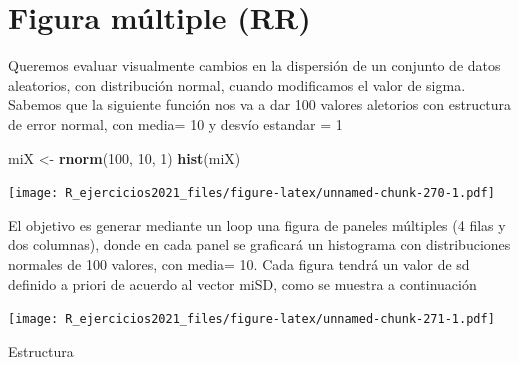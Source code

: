 \documentclass[]{book}
\newenvironment{Shaded}{\begin{snugshade}}{\end{snugshade}}
\newcommand{\DecValTok}[1]{\textcolor[rgb]{0.00,0.00,0.81}{#1}}
\newcommand{\KeywordTok}[1]{\textcolor[rgb]{0.13,0.29,0.53}{\textbf{#1}}}
\newcommand{\NormalTok}[1]{#1}
\newcommand{\StringTok}[1]{\textcolor[rgb]{0.31,0.60,0.02}{#1}}
\begin{document}
\hypertarget{figura-muxfaltiple-rr}{%
\section{Figura múltiple (RR)}\label{figura-muxfaltiple-rr}}

Queremos evaluar visualmente cambios en la dispersión de un conjunto de datos aleatorios, con distribución normal, cuando modificamos el valor de sigma. Sabemos que la siguiente función nos va a dar 100 valores aletorios con estructura de error normal, con media= 10 y desvío estandar = 1

\begin{Shaded}
\begin{Highlighting}[]
\NormalTok{miX <-}\StringTok{ }\KeywordTok{rnorm}\NormalTok{(}\DecValTok{100}\NormalTok{, }\DecValTok{10}\NormalTok{, }\DecValTok{1}\NormalTok{)}
\KeywordTok{hist}\NormalTok{(miX)}
\end{Highlighting}
\end{Shaded}

\texttt{[image: R\_ejercicios2021\_files/figure-latex/unnamed-chunk-270-1.pdf]}

El objetivo es generar mediante un loop una figura de paneles múltiples (4 filas y dos columnas), donde en cada panel se graficará un histograma con distribuciones normales de 100 valores, con media= 10. Cada figura tendrá un valor de sd definido a priori de acuerdo al vector miSD, como se muestra a continuación

\texttt{[image: R\_ejercicios2021\_files/figure-latex/unnamed-chunk-271-1.pdf]}

Estructura
\end{document}
